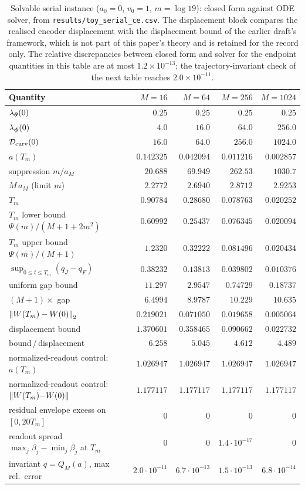 \begin{table}[htbp]
\centering
\small
\caption{Solvable serial instance ($a_0 = 0$, $v_0 = 1$, $m = \log 19$):
closed form against ODE solver, from \texttt{results/toy\_serial\_ce.csv}. The
displacement block compares the realised encoder displacement with the
displacement bound of the earlier draft's framework, which is not part of
this paper's theory and is retained for the record only. The relative
discrepancies between closed form and solver for the endpoint quantities
in this table are at most $1.2\times10^{-13}$; the trajectory-invariant
check of the next table reaches $2.0\times10^{-11}$.}
\label{tab:app_toy}
\begin{tabular}{lrrrr}
\toprule
Quantity & $M = 16$ & $M = 64$ & $M = 256$ & $M = 1024$ \\
\midrule
$\lambda_{\boldsymbol{\theta}}(0)$ & $0.25$ & $0.25$ & $0.25$ & $0.25$ \\
$\lambda_{\boldsymbol{\phi}}(0)$ & $4.0$ & $16.0$ & $64.0$ & $256.0$ \\
$\mathcal{D}_{\mathrm{curv}}(0)$ & $16.0$ & $64.0$ & $256.0$ & $1024.0$ \\
\midrule
$a(T_m)$ & $0.142325$ & $0.042094$ & $0.011216$ & $0.002857$ \\
suppression $m/a_M$ & $20.688$ & $69.949$ & $262.53$ & $1030.7$ \\
$M\,a_M$ (limit $m$) & $2.2772$ & $2.6940$ & $2.8712$ & $2.9253$ \\
$T_m$ & $0.90784$ & $0.28680$ & $0.078763$ & $0.020252$ \\
$T_m$ lower bound $\Psi(m)/(M{+}1{+}2m^2)$ & $0.60992$ & $0.25437$ & $0.076345$ & $0.020094$ \\
$T_m$ upper bound $\Psi(m)/(M{+}1)$ & $1.2320$ & $0.32222$ & $0.081496$ & $0.020434$ \\
\midrule
$\sup_{0\le t\le T_m}(q_J - q_F)$ & $0.38232$ & $0.13813$ & $0.039802$ & $0.010376$ \\
uniform gap bound & $11.297$ & $2.9547$ & $0.74729$ & $0.18737$ \\
$(M{+}1)\times$ gap & $6.4994$ & $8.9787$ & $10.229$ & $10.635$ \\
\midrule
$\left\lVert W(T_m) - W(0)\right\rVert_2$ & $0.219021$ & $0.071050$ & $0.019658$ & $0.005064$ \\
displacement bound & $1.370601$ & $0.358465$ & $0.090662$ & $0.022732$ \\
bound\,/\,displacement & $6.258$ & $5.045$ & $4.612$ & $4.489$ \\
\midrule
normalized-readout control: $a(T_m)$ & $1.026947$ & $1.026947$ & $1.026947$ & $1.026947$ \\
normalized-readout control: $\left\lVert W(T_m){-}W(0)\right\rVert$ & $1.177117$ & $1.177117$ & $1.177117$ & $1.177117$ \\
\midrule
residual envelope excess on $[0, 20T_m]$ & $0$ & $0$ & $0$ & $0$ \\
readout spread $\max_j\beta_j - \min_j\beta_j$ at $T_m$ & $0$ & $0$ & $1.4\cdot10^{-17}$ & $0$ \\
invariant $q = Q_M(a)$, max rel.\ error & $2.0\cdot10^{-11}$ & $6.7\cdot10^{-13}$ & $1.5\cdot10^{-13}$ & $6.8\cdot10^{-14}$ \\
\bottomrule
\end{tabular}
\end{table}

